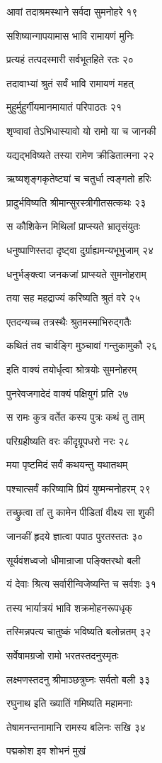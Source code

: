 आवां तदाश्रमस्थाने सर्वदा सुमनोहरे १९

सशिष्यान्गापयामास भावि रामायणं मुनिः

प्रत्यहं तत्पदस्मारी सर्वभूतहिते रतः २०

तदावाभ्यां श्रुतं सर्वं भावि रामायणं महत्

मुहुर्मुहुर्गीयमानमायातं परिपाठतः २१

शृण्वावां तेऽभिधास्यावो यो रामो या च जानकी

यद्यद्भविष्यते तस्या रामेण क्रीडितात्मना २२

ऋष्यशृङ्गकृतेष्ट्यां च चतुर्धा त्वङ्गतो हरिः

प्रादुर्भविष्यति श्रीमान्सुरस्त्रीगीतसत्कथः २३

स कौशिकेन मिथिलां प्राप्स्यते भ्रातृसंयुतः

धनुष्पाणिस्तदा दृष्ट्वा दुर्ग्राह्यमन्यभूभुजाम् २४

धनुर्भङ्क्त्वा जनकजां प्राप्स्यते सुमनोहराम्

तया सह महद्राज्यं करिष्यति श्रुतं वरे २५

एतदन्यच्च तत्रस्थैः श्रुतमस्माभिरुद्गतैः

कथितं तव चार्वङ्गि मुञ्चावां गन्तुकामुकौ २६

इति वाक्यं तयोर्धृत्वा श्रोत्रयोः सुमनोहरम्

पुनरेवजगादेदं वाक्यं पक्षियुगं प्रति २७

स रामः कुत्र वर्तेत कस्य पुत्रः कथं तु ताम्

परिग्रहीष्यति वरः कीदृग्रूपधरो नरः २८

मया पृष्टमिदं सर्वं कथयन्तु यथातथम्

पश्चात्सर्वं करिष्यामि प्रियं युष्मन्मनोहरम् २९

तच्छ्रुत्वा तां तु कामेन पीडितां वीक्ष्य सा शुकी

जानकीं हृदये ज्ञात्वा पपाठ पुरतस्ततः ३०

सूर्यवंशध्वजो धीमान्राजा पङ्क्तिरथो बली

यं देवाः श्रित्य सर्वारीन्विजेष्यन्ति च सर्वशः ३१

तस्य भार्यात्रयं भावि शक्रमोहनरूपधृक्

तस्मिन्नपत्य चातुष्कं भविष्यति बलोन्नतम् ३२

सर्वेषामग्रजो रामो भरतस्तदनुस्मृतः

लक्ष्मणस्तदनु श्रीमाञ्छत्रुघ्नः सर्वतो बली ३३

रघुनाथ इति ख्यातिं गमिष्यति महामनाः

तेषामनन्तनामानि रामस्य बलिनः सखि ३४

पद्मकोश इव शोभनं मुखं

